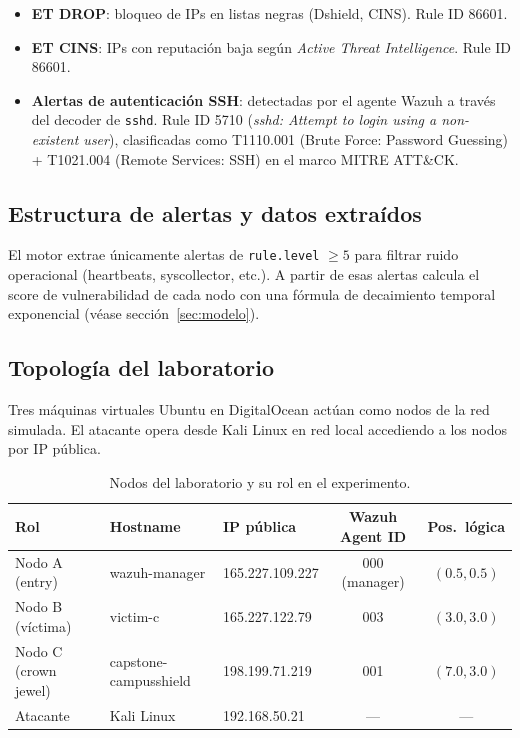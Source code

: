 \documentclass[12pt,a4paper]{article}
\begin{document}
\begin{itemize}
  \item \textbf{ET DROP}: bloqueo de IPs en listas negras (Dshield, CINS).
    Rule ID 86601.
  \item \textbf{ET CINS}: IPs con reputación baja según
    \emph{Active Threat Intelligence}. Rule ID 86601.
  \item \textbf{Alertas de autenticación SSH}: detectadas por el agente
    Wazuh a través del decoder de \texttt{sshd}. Rule ID 5710
    (\emph{sshd: Attempt to login using a non-existent user}),
    clasificadas como T1110.001 (Brute Force: Password Guessing) +
    T1021.004 (Remote Services: SSH) en el marco MITRE ATT\&CK.
\end{itemize}

\subsection{Estructura de alertas y datos extraídos}

El motor extrae únicamente alertas de \texttt{rule.level} $\geq 5$
para filtrar ruido operacional (heartbeats, syscollector, etc.). A
partir de esas alertas calcula el score de vulnerabilidad de cada nodo
con una fórmula de decaimiento temporal exponencial (véase
sección~\ref{sec:modelo}).

\subsection{Topología del laboratorio}

Tres máquinas virtuales Ubuntu en DigitalOcean actúan como nodos de
la red simulada. El atacante opera desde Kali Linux en red local
accediendo a los nodos por IP pública.

\begin{table}[H]
  \centering
  \caption{Nodos del laboratorio y su rol en el experimento.}
  \begin{tabular}{@{}lllcc@{}}
    \toprule
    Rol & Hostname & IP pública & Wazuh Agent ID & Pos.\ lógica \\
    \midrule
    Nodo A (entry)       & wazuh-manager        & 165.227.109.227 & 000 (manager) & $(0.5,0.5)$ \\
    Nodo B (víctima)     & victim-c             & 165.227.122.79  & 003           & $(3.0,3.0)$ \\
    Nodo C (crown jewel) & capstone-campusshield& 198.199.71.219  & 001           & $(7.0,3.0)$ \\
    Atacante             & Kali Linux           & 192.168.50.21   & ---           & --- \\
    \bottomrule
  \end{tabular}
\end{table}
\end{document}

